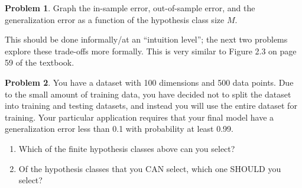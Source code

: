 \documentclass[10pt]{exam}
\theoremstyle{definition}
\newtheorem{problem}{Problem}
\newtheorem{theorem}{Theorem}
\DeclareMathOperator{\prob}{\mathbb P}
\newcommand{\HH}[1]{\mathcal H_{\text{#1}}}
\begin{document}
\vspace{3in}
\begin{problem}
    Graph the in-sample error, out-of-sample error, and the generalization error as a function of the hypothesis class size $M$.

    This should be done informally/at an ``intuition level''; the next two problems explore these trade-offs more formally.
    This is very similar to Figure 2.3 on page 59 of the textbook.
\end{problem}

\newpage
\begin{problem}
    You have a dataset with 100 dimensions and 500 data points.
    Due to the small amount of training data, you have decided not to split the dataset into training and testing datasets,
    and instead you will use the entire dataset for training.
    Your particular application requires that your final model have a generalization error less than 0.1 with probability at least 0.99.
    \begin{enumerate}
        \item
    Which of the finite hypothesis classes above can you select?

            \vspace{4in}
\item
    Of the hypothesis classes that you CAN select, which one SHOULD you select?
    \end{enumerate}

\end{problem}


\end{document}
